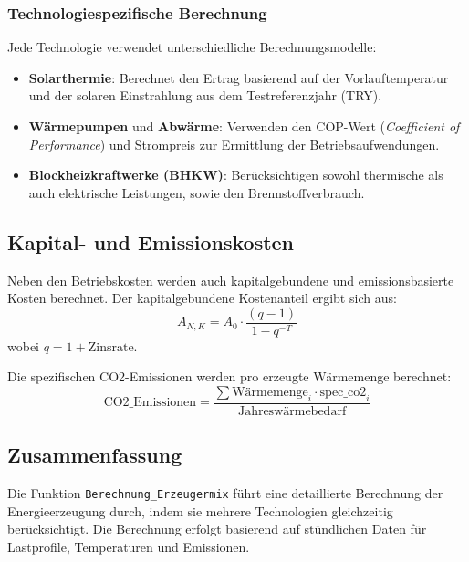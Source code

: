 \subsubsection{Technologiespezifische Berechnung}
Jede Technologie verwendet unterschiedliche Berechnungsmodelle:

\begin{itemize}
    \item \textbf{Solarthermie}: Berechnet den Ertrag basierend auf der Vorlauftemperatur und der solaren Einstrahlung aus dem Testreferenzjahr (TRY).
    \item \textbf{Wärmepumpen} und \textbf{Abwärme}: Verwenden den COP-Wert (\emph{Coefficient of Performance}) und Strompreis zur Ermittlung der Betriebsaufwendungen.
    \item \textbf{Blockheizkraftwerke (BHKW)}: Berücksichtigen sowohl thermische als auch elektrische Leistungen, sowie den Brennstoffverbrauch.
\end{itemize}

\subsection{Kapital- und Emissionskosten}
Neben den Betriebskosten werden auch kapitalgebundene und emissionsbasierte Kosten berechnet. Der kapitalgebundene Kostenanteil ergibt sich aus:
\[
A_{N,K} = A_0 \cdot \frac{(q - 1)}{1 - q^{-T}}
\]
wobei \( q = 1 + \text{Zinsrate} \).

Die spezifischen CO2-Emissionen werden pro erzeugte Wärmemenge berechnet:
\[
\text{CO2\_Emissionen} = \frac{\sum \text{Wärmemenge}_i \cdot \text{spec\_co2}_i}{\text{Jahreswärmebedarf}}
\]

\subsection{Zusammenfassung}
Die Funktion \texttt{Berechnung\_Erzeugermix} führt eine detaillierte Berechnung der Energieerzeugung durch, indem sie mehrere Technologien gleichzeitig berücksichtigt. Die Berechnung erfolgt basierend auf stündlichen Daten für Lastprofile, Temperaturen und Emissionen.